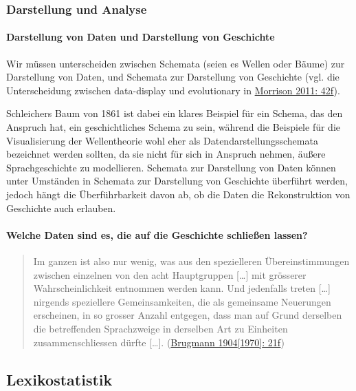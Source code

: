 \subsubsection{\texorpdfstring{{Darstellung und
Analyse}}{Darstellung und Analyse}}

\paragraph{Darstellung von Daten und Darstellung von Geschichte}

Wir müssen unterscheiden zwischen Schemata (seien es Wellen oder Bäume)
zur Darstellung von Daten, und Schemata zur Darstellung von Geschichte
(vgl. die Unterscheidung zwischen data-display und evolutionary in
\href{http://bibliography.lingpy.org?key=Morrison2011}{Morrison 2011:
42f}).





Schleichers Baum von 1861 ist dabei ein klares Beispiel für ein Schema,
das den Anspruch hat, ein geschichtliches Schema zu sein, während die
Beispiele für die Visualisierung der Wellentheorie wohl eher als
Datendarstellungsschemata bezeichnet werden sollten, da sie nicht für
sich in Anspruch nehmen, äußere Sprachgeschichte zu modellieren.
Schemata zur Darstellung von Daten können unter Umständen in Schemata
zur Darstellung von Geschichte überführt werden, jedoch hängt die
Überführbarkeit davon ab, ob die Daten die Rekonstruktion von Geschichte
auch erlauben.




\paragraph{Welche Daten sind es, die auf die Geschichte schließen lassen?}

\begin{quote}
Im ganzen ist also nur wenig, was aus den spezielleren Übereinstimmungen
zwischen einzelnen von den acht Hauptgruppen {[}\ldots{}{]} mit
grösserer Wahrscheinlichkeit entnommen werden kann. Und jedenfalls
treten {[}\ldots{}{]} nirgends speziellere Gemeinsamkeiten, die als
gemeinsame Neuerungen erscheinen, in so grosser Anzahl entgegen, dass
man auf Grund derselben die betreffenden Sprachzweige in derselben Art
zu Einheiten zusammenschliessen dürfte {[}\ldots{}{]}.
(\href{http://bibliography.lingpy.org?key=Brugmann1904}{Brugmann
1904{[}1970{]}: 21f})
\end{quote}

\subsection{Lexikostatistik}

